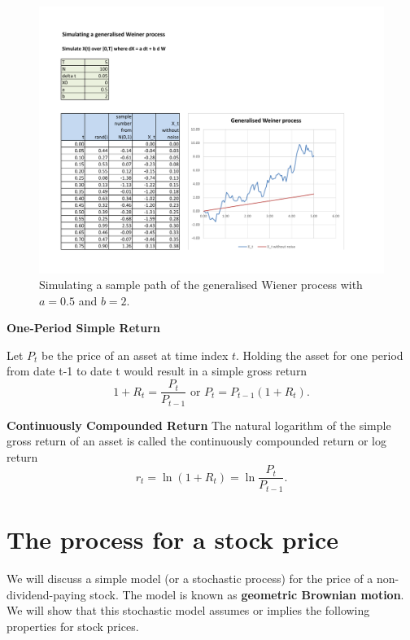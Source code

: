 \documentclass[landscape, 20pt]{extreport}
\theoremstyle{definition}
\theoremstyle{definition}
\theoremstyle{definition}
\theoremstyle{definition}
\theoremstyle{remark}
\begin{document}
\begin{figure}
\hypertarget{fig:GW}{%
\centering
\includegraphics[width=8in,height=\textheight]{GW2.pdf}
\caption{Simulating a sample path of the generalised Wiener process with
\(a =0.5\) and \(b = 2\).}\label{fig:GW}
}
\end{figure}

\textbf{One-Period Simple Return}

Let \(P_t\) be the price of an asset at time index \(t\). Holding the asset
for one period from date t-1 to date t would result in a simple gross
return
\[1 + R_t =  \frac{P_t}{P_{t-1}}   \text{    or     }    P_t = P_{t-1} (1 + R_t).\]

\textbf{Continuously Compounded Return} The natural logarithm of the simple
gross return of an asset is called the continuously compounded return or
log return \[r_t = \ln(1 + R_t) = \ln\frac{P_t}{P_{t-1}}.\]

\hypertarget{the-process-for-a-stock-price}{%
\section{The process for a stock price}\label{the-process-for-a-stock-price}}

We will discuss a simple model (or a stochastic process) for the price
of a non-dividend-paying stock. The model is known as \textbf{geometric
Brownian motion}. We will show that this stochastic model assumes or
implies the following properties for stock prices.
\end{document}
